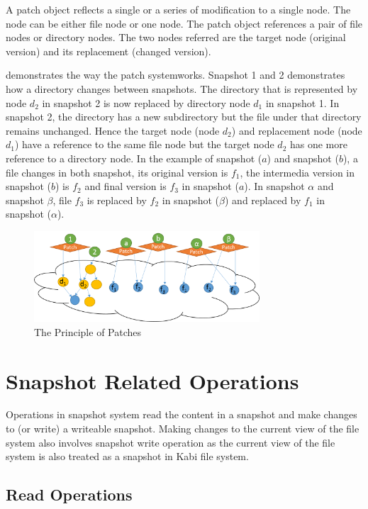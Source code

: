     A patch object reflects a single or a series of modification to a single node. The node can be either file node or one node. The patch object references a pair of file nodes or directory nodes. The two nodes referred are the target node (original version) and its replacement (changed version).

     demonstrates the way the patch systemworks. Snapshot 1 and 2 demonstrates how a directory changes between snapshots. The directory that is represented by node $d_2$ in snapshot 2 is now replaced by directory node $d_1$ in snapshot 1. In snapshot 2, the directory has a new subdirectory but the file under that directory remains unchanged. Hence the target node (node $d_2$) and replacement node (node $d_1$) have a reference to the same file node but the target node $d_2$ has one more reference to a directory node. In the example of snapshot ($a$) and snapshot ($b$), a file changes in both snapshot, its original version is $f_1$, the intermedia version in snapshot ($b$) is $f_2$ and final version is $f_3$ in snapshot ($a$). In snapshot $\alpha$ and snapshot $\beta$, file $f_3$ is replaced by $f_2$ in snapshot ($\beta$) and replaced by $f_1$ in snapshot ($\alpha$).  

\begin{figure}[t]
\centering
\includegraphics[width=0.75\textwidth]{Chapter-4/figs/fig14.png}
\caption{The Principle of Patches}
\label{fig:patches}
\end{figure}

\section{Snapshot Related Operations}

    Operations in snapshot system read the content in a snapshot and make changes to (or write) a writeable snapshot. Making changes to the current view of the file system also involves snapshot write operation as the current view of the file system is also treated as a snapshot in Kabi file system.

\subsection{Read Operations}

